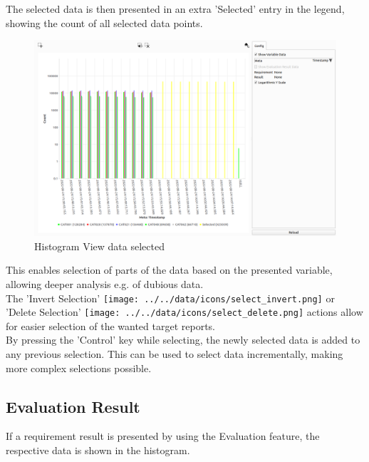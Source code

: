 The selected data is then presented in an extra 'Selected' entry in the legend, showing the count of all selected data points.

\begin{figure}[H]
    \hspace*{-2cm}
    \includegraphics[width=18cm,frame]{figures/histogram_selected.png}
  \caption{Histogram View data selected}
\end{figure}

This enables selection of parts of the data based on the presented variable, allowing deeper analysis e.g. of dubious data. \\

The 'Invert Selection' \texttt{[image: ../../data/icons/select\_invert.png]} or 'Delete Selection' \texttt{[image: ../../data/icons/select\_delete.png]} actions allow for easier selection of the wanted target reports. \\

By pressing the 'Control' key while selecting, the newly selected data is added to any previous selection. This can be used to select data incrementally, making more complex selections possible.

\subsection{Evaluation Result}

If a requirement result is presented by using the Evaluation feature, the respective data is shown in the histogram.

